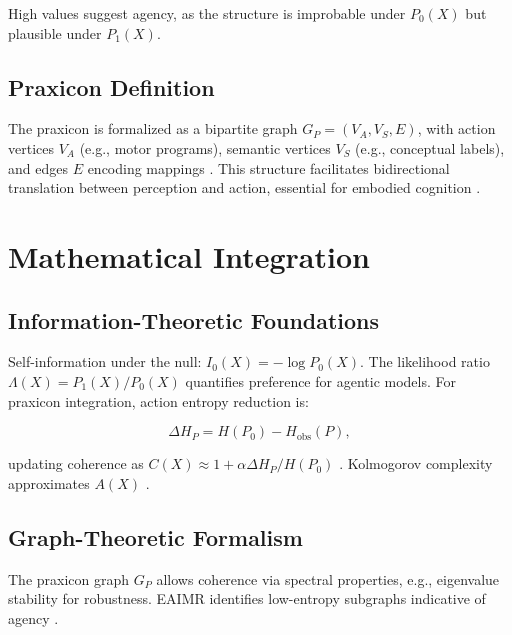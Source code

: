 \documentclass{article}
\begin{document}
High values suggest agency, as the structure is improbable under $P_0(X)$ but plausible under $P_1(X)$.

\subsection{Praxicon Definition}
The praxicon is formalized as a bipartite graph $G_P = (V_A, V_S, E)$, with action vertices $V_A$ (e.g., motor programs), semantic vertices $V_S$ (e.g., conceptual labels), and edges $E$ encoding mappings \citep{panunzi2018}. This structure facilitates bidirectional translation between perception and action, essential for embodied cognition \citep{barsalou2008}.

\section{Mathematical Integration}
\label{sec:integration}

\subsection{Information-Theoretic Foundations}
Self-information under the null: $I_0(X) = -\log P_0(X)$. The likelihood ratio $\Lambda(X) = P_1(X)/P_0(X)$ quantifies preference for agentic models. For praxicon integration, action entropy reduction is:

\[ \Delta H_P = H(P_0) - H_{\mathrm{obs}}(P), \]

updating coherence as $C(X) \approx 1 + \alpha \Delta H_P / H(P_0)$ \citep{shannon1948,jaynes2003}. Kolmogorov complexity approximates $A(X)$ \citep{kolmogorov1965}.

\subsection{Graph-Theoretic Formalism}
The praxicon graph $G_P$ allows coherence via spectral properties, e.g., eigenvalue stability for robustness. EAIMR identifies low-entropy subgraphs indicative of agency \citep{newell1990}.
\end{document}
